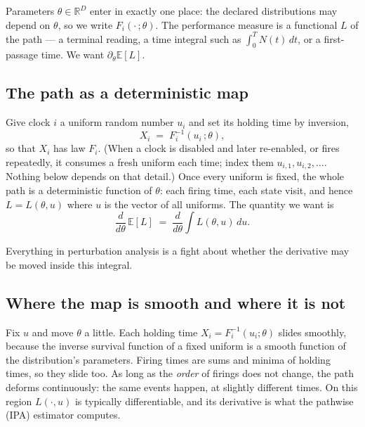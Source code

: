 \documentclass[11pt]{article}
\newcommand{\E}{\mathbb{E}}
\begin{document}
Parameters $\theta \in \mathbb{R}^D$ enter in exactly one place: the
declared distributions may depend on $\theta$, so we write
$F_i(\cdot\,;\theta)$. The performance measure is a functional $L$ of the
path --- a terminal reading, a time integral such as
$\int_0^T N(t)\,dt$, or a first-passage time. We want
$\partial_\theta \E[L]$.

\subsection{The path as a deterministic map}

Give clock $i$ a uniform random number $u_i$ and set its holding time by
inversion,
\[
X_i \;=\; F_i^{-1}(u_i\,;\theta),
\]
so that $X_i$ has law $F_i$. (When a clock is disabled and later
re-enabled, or fires repeatedly, it consumes a fresh uniform each time;
index them $u_{i,1}, u_{i,2}, \dots$. Nothing below depends on that
detail.) Once every uniform is fixed, the whole path is a deterministic
function of $\theta$: each firing time, each state visit, and hence
$L = L(\theta, u)$ where $u$ is the vector of all uniforms. The quantity
we want is
\[
\frac{d}{d\theta}\,\E[L] \;=\; \frac{d}{d\theta} \int L(\theta, u)\,du .
\]

Everything in perturbation analysis is a fight about whether the
derivative may be moved inside this integral.

\subsection{Where the map is smooth and where it is not}

Fix $u$ and move $\theta$ a little. Each holding time
$X_i = F_i^{-1}(u_i;\theta)$ slides smoothly, because the inverse
survival function of a fixed uniform is a smooth function of the
distribution's parameters. Firing times are sums and minima of holding
times, so they slide too. As long as the \emph{order} of firings does not
change, the path deforms continuously: the same events happen, at
slightly different times. On this region $L(\cdot, u)$ is typically
differentiable, and its derivative is what the pathwise (IPA) estimator
computes.
\end{document}
